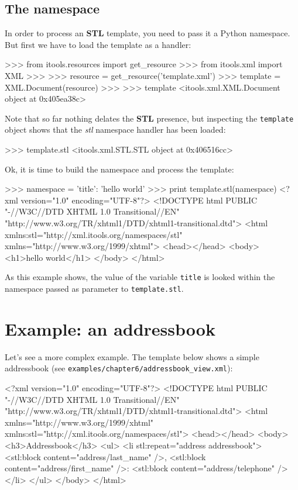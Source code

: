 \subsection{The namespace}

In order to process an {\bf STL} template, you need to pass it a Python
namespace. But first we have to load the template as a handler:

\begin{code}
    >>> from itools.resources import get_resource
    >>> from itools.xml import XML
    >>>   
    >>> resource = get_resource('template.xml')
    >>> template = XML.Document(resource)
    >>> 
    >>> template
    <itools.xml.XML.Document object at 0x405ea38c>
\end{code}

Note that so far nothing delates the {\bf STL} presence, but inspecting
the {\tt template} object shows that the {\em stl} namespace handler has
been loaded:

\begin{code}
    >>> template.stl
    <itools.xml.STL.STL object at 0x406516cc>
\end{code}

Ok, it is time to build the namespace and process the template:

\begin{code}
    >>> namespace = {'title': 'hello world'}
    >>> print template.stl(namespace)
    <?xml version="1.0" encoding="UTF-8"?>
    <!DOCTYPE html
         PUBLIC "-//W3C//DTD XHTML 1.0 Transitional//EN"
        "http://www.w3.org/TR/xhtml1/DTD/xhtml1-transitional.dtd">
    <html xmlns:stl="http://xml.itools.org/namespaces/stl"
          xmlns="http://www.w3.org/1999/xhtml">
      <head></head>
      <body>
        <h1>hello world</h1>
      </body>
    </html>
\end{code}


As this example shows, the value of the variable {\tt title} is looked within
the namespace passed as parameter to {\tt template.stl}.


\section{Example: an addressbook}

Let's see a more complex example. The template below shows a simple
addressbook (see {\tt examples/chapter6/addressbook\_view.xml}):

\begin{code}
    <?xml version="1.0" encoding="UTF-8"?>
    <!DOCTYPE html
         PUBLIC "-//W3C//DTD XHTML 1.0 Transitional//EN"
         "http://www.w3.org/TR/xhtml1/DTD/xhtml1-transitional.dtd">
    <html xmlns="http://www.w3.org/1999/xhtml"
          xmlns:stl="http://xml.itools.org/namespaces/stl">
      <head></head>
      <body>
        <h3>Addressbook</h3>
        <ul>
          <li stl:repeat="address addressbook">
            <stl:block content="address/last_name" />,
            <stl:block content="address/first_name" />:
            <stl:block content="address/telephone" />
          </li>
        </ul>
      </body>
    </html>
\end{code}

